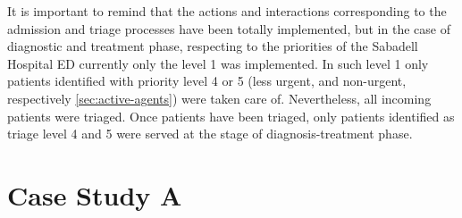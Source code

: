 \documentclass[11pt]{article} %
\begin{document}
It is important to remind that the actions and interactions corresponding
to the admission and triage processes have been totally implemented,
but in the case of diagnostic and treatment phase, respecting to the
priorities of the Sabadell Hospital ED currently only the level 1
was implemented. In such level 1 only patients identified with priority
level 4 or 5 (less urgent, and non-urgent, respectively \ref{sec:active-agents})
were taken care of. Nevertheless, all incoming patients were triaged.
Once patients have been triaged, only patients identified as triage
level 4 and 5 were served at the stage of diagnosis-treatment phase.

\section{Case Study A \label{sub:Case-Study-A}}
\end{document}
